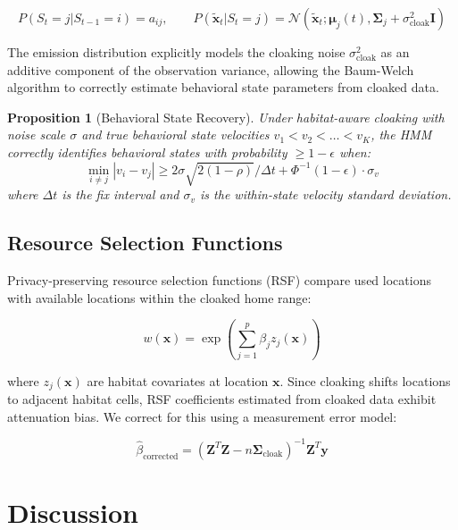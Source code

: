 \documentclass[11pt,letterpaper]{article}
\newtheorem{proposition}[theorem]{Proposition}
\begin{document}
\begin{equation}
P(S_t = j | S_{t-1} = i) = a_{ij}, \qquad P(\tilde{\mathbf{x}}_t | S_t = j) = \mathcal{N}(\tilde{\mathbf{x}}_t; \boldsymbol{\mu}_j(t), \boldsymbol{\Sigma}_j + \sigma_{\text{cloak}}^2 \mathbf{I})
\end{equation}

The emission distribution explicitly models the cloaking noise $\sigma_{\text{cloak}}^2$ as an additive component of the observation variance, allowing the Baum-Welch algorithm to correctly estimate behavioral state parameters from cloaked data.

\begin{proposition}[Behavioral State Recovery]
Under habitat-aware cloaking with noise scale $\sigma$ and true behavioral state velocities $v_1 < v_2 < \ldots < v_K$, the HMM correctly identifies behavioral states with probability $\geq 1 - \epsilon$ when:
\begin{equation}
\min_{i \neq j} |v_i - v_j| \geq 2\sigma\sqrt{2(1-\rho)} / \Delta t + \Phi^{-1}(1-\epsilon) \cdot \sigma_v
\end{equation}
where $\Delta t$ is the fix interval and $\sigma_v$ is the within-state velocity standard deviation.
\end{proposition}

\subsection{Resource Selection Functions}

Privacy-preserving resource selection functions (RSF) compare used locations with available locations within the cloaked home range:

\begin{equation}
w(\mathbf{x}) = \exp\left(\sum_{j=1}^{p} \beta_j z_j(\mathbf{x})\right)
\end{equation}

where $z_j(\mathbf{x})$ are habitat covariates at location $\mathbf{x}$. Since cloaking shifts locations to adjacent habitat cells, RSF coefficients estimated from cloaked data exhibit attenuation bias. We correct for this using a measurement error model:

\begin{equation}
\hat{\beta}_{\text{corrected}} = (\mathbf{Z}^T \mathbf{Z} - n\boldsymbol{\Sigma}_{\text{cloak}})^{-1} \mathbf{Z}^T \mathbf{y}
\end{equation}

\section{Discussion}
\end{document}
